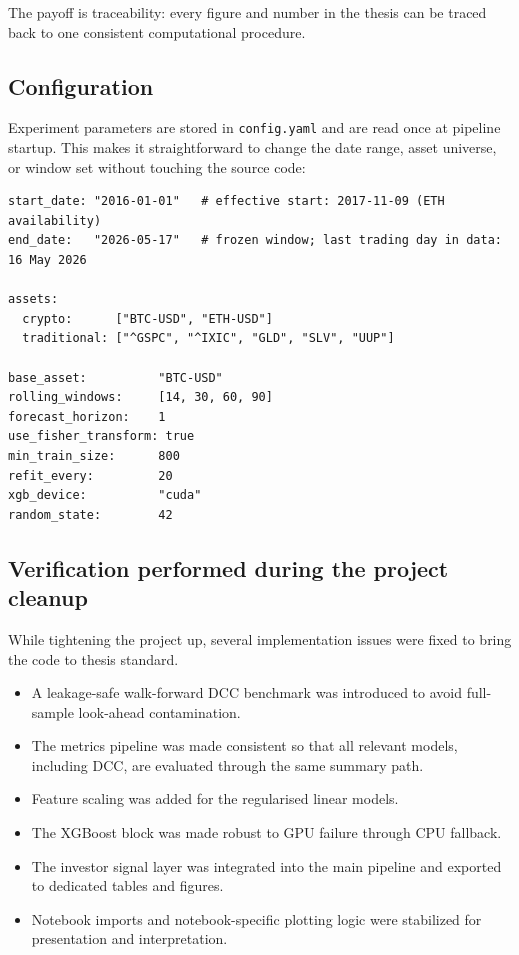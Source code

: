 The payoff is traceability: every figure and number in the thesis can be traced back to one consistent computational procedure.

\subsection{Configuration}

Experiment parameters are stored in \texttt{config.yaml} and are read once at pipeline startup. This makes it straightforward to change the date range, asset universe, or window set without touching the source code:

\begin{lstlisting}[language={}, caption={Excerpt from \texttt{config.yaml} showing key experiment parameters.}, label=lst:config]
start_date: "2016-01-01"   # effective start: 2017-11-09 (ETH availability)
end_date:   "2026-05-17"   # frozen window; last trading day in data: 16 May 2026

assets:
  crypto:      ["BTC-USD", "ETH-USD"]
  traditional: ["^GSPC", "^IXIC", "GLD", "SLV", "UUP"]

base_asset:          "BTC-USD"
rolling_windows:     [14, 30, 60, 90]
forecast_horizon:    1
use_fisher_transform: true
min_train_size:      800
refit_every:         20
xgb_device:          "cuda"
random_state:        42
\end{lstlisting}

\subsection{Verification performed during the project cleanup}

While tightening the project up, several implementation issues were fixed to bring the code to thesis standard.

\begin{itemize}
    \item A leakage-safe walk-forward DCC benchmark was introduced to avoid full-sample look-ahead contamination.
    \item The metrics pipeline was made consistent so that all relevant models, including DCC, are evaluated through the same summary path.
    \item Feature scaling was added for the regularised linear models.
    \item The XGBoost block was made robust to GPU failure through CPU fallback.
    \item The investor signal layer was integrated into the main pipeline and exported to dedicated tables and figures.
    \item Notebook imports and notebook-specific plotting logic were stabilized for presentation and interpretation.
\end{itemize}

